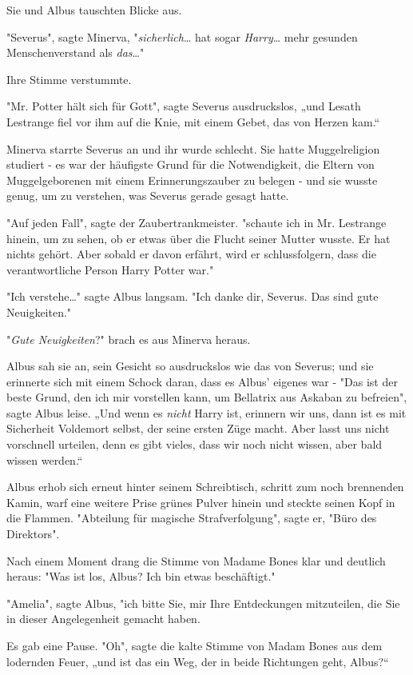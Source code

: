 {Sie und Albus tauschten Blicke aus.

"Severus", sagte Minerva, "\emph{sicherlich}… hat sogar \emph{Harry}… mehr gesunden Menschenverstand als \emph{das}…"

Ihre Stimme verstummte.

"Mr. Potter hält sich für Gott", sagte Severus ausdruckslos, „und Lesath Lestrange fiel vor ihm auf die Knie, mit einem Gebet, das von Herzen kam.“

Minerva starrte Severus an und ihr wurde schlecht. Sie hatte Muggelreligion studiert - es war der häufigste Grund für die Notwendigkeit, die Eltern von Muggelgeborenen mit einem Erinnerungszauber zu belegen - und sie wusste genug, um zu verstehen, was Severus gerade gesagt hatte.

"Auf jeden Fall", sagte der Zaubertrankmeister. "schaute ich in Mr. Lestrange hinein, um zu sehen, ob er etwas über die Flucht seiner Mutter wusste. Er hat nichts gehört. Aber sobald er davon erfährt, wird er schlussfolgern, dass die verantwortliche Person Harry Potter war."

"Ich verstehe…" sagte Albus langsam. "Ich danke dir, Severus. Das sind gute Neuigkeiten."

"\emph{Gute Neuigkeiten}?" brach es aus Minerva heraus.

Albus sah sie an, sein Gesicht so ausdruckslos wie das von Severus; und sie erinnerte sich mit einem Schock daran, dass es Albus' eigenes war - "Das ist der beste Grund, den ich mir vorstellen kann, um Bellatrix aus Askaban zu befreien", sagte Albus leise. „Und wenn es \emph{nicht} Harry ist, erinnern wir uns, dann ist es mit Sicherheit Voldemort selbst, der seine ersten Züge macht. Aber lasst uns nicht vorschnell urteilen, denn es gibt vieles, dass wir noch nicht wissen, aber bald wissen werden.“

Albus erhob sich erneut hinter seinem Schreibtisch, schritt zum noch brennenden Kamin, warf eine weitere Prise grünes Pulver hinein und steckte seinen Kopf in die Flammen. "Abteilung für magische Strafverfolgung", sagte er, "Büro des Direktors".

Nach einem Moment drang die Stimme von Madame Bones klar und deutlich heraus: "Was ist los, Albus? Ich bin etwas beschäftigt."

"Amelia", sagte Albus, "ich bitte Sie, mir Ihre Entdeckungen mitzuteilen, die Sie in dieser Angelegenheit gemacht haben.

Es gab eine Pause. "Oh", sagte die kalte Stimme von Madam Bones aus dem lodernden Feuer, „und ist das ein Weg, der in beide Richtungen geht, Albus?“

}
